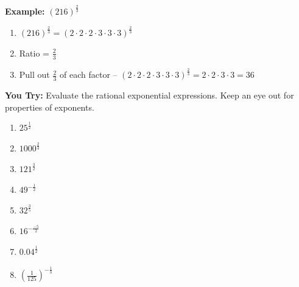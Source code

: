 \documentclass[12pt]{article}
\begin{document}
\textbf{Example:} $\left(216\right)^{\frac{2}{3}}$\\

	\begin{enumerate}
	
		\item $\left(216\right)^{\frac{2}{3}}= \left( 2 \cdot 2 \cdot 2 \cdot 3 \cdot 3 \cdot 3\right)^{\frac{2}{3}}$\\
		
		\item Ratio = $\frac{2}{3}$\\
		
		\item Pull out $\frac{2}{3}$ of each factor  -- $\left( 2 \cdot 2 \cdot 2 \cdot 3 \cdot 3 \cdot 3\right)^{\frac{2}{3}}= 2 \cdot 2 \cdot 3 \cdot 3 = 36$
	
	
	\end{enumerate}

\hrulefill

\textbf{You Try:} Evaluate the rational exponential expressions. Keep an eye out for properties of exponents.\\

\begin{multicols}{2}
\begin{enumerate}
		\setlength\itemsep{1cm}

\item $25^{\frac{1}{2}}$\\

\item $1000^{\frac{2}{3}}$\\

\item $121^{\frac{3}{2}}$\\

\item $49^{-\frac{1}{2}}$\\

\item  $32^{\frac{3}{5}}$\\

\item $16^{-\frac{-5}{2}}$\\

\item $0.04^{\frac{1}{2}}$\\

\item $\left(\frac{1}{125}\right)^{-\frac{1}{3}}$

\end{enumerate}
\end{multicols}
\end{document}
